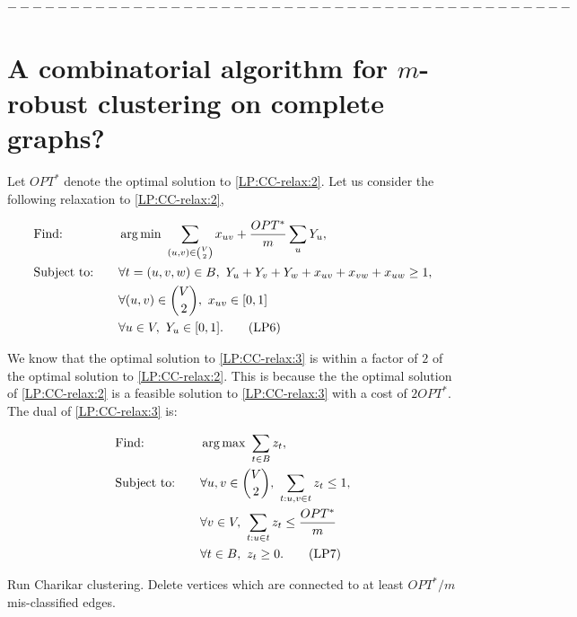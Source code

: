 $---------------------------------------------$

\section{A combinatorial algorithm for $m$-robust clustering on complete graphs?}

Let $OPT^*$ denote the optimal solution to \ref{LP:CC-relax:2}. Let us consider the following relaxation to \ref{LP:CC-relax:2},

\begin{alignat}{3} \label{LP:CC-relax:3}
		&\text{Find: } && \operatorname*{arg\,min}\ \sum_{(u,v) \in \binom{V}{2}} x_{uv} + \frac{OPT^*}{m} \sum_u Y_u, \nonumber\\
		&\text{Subject to:} \quad && \forall t = (u,v,w) \in B ,\ Y_u + Y_v + Y_w + x_{uv} + x_{vw} + x_{uw} \ge 1, \nonumber\\
		& && \forall (u,v) \in \binom{V}{2},\ x_{uv} \in [ 0,1 ] \nonumber\\
		& && \forall u \in V,\ Y_u \in [0,1]. \tag{LP6}
\end{alignat}

\noindent We know that the optimal solution to \ref{LP:CC-relax:3} is within a factor of $2$ of the optimal solution to \ref{LP:CC-relax:2}. This is because the the optimal solution of \ref{LP:CC-relax:2} is a feasible solution to \ref{LP:CC-relax:3} with a cost of $2 OPT^*$. The dual of \ref{LP:CC-relax:3} is:

\begin{alignat}{3} \label{LP:CC-relax-dual:3}
		&\text{Find: } && \operatorname*{arg\,max}\ \sum_{t \in B} z_t, \nonumber\\
		&\text{Subject to:} \quad && \forall u,v \in \binom{V}{2},\ \sum_{t : u,v \in t} z_t \le 1, \nonumber\\
		& && \forall v \in V,\ \sum_{t : u \in t} z_t \le \frac{OPT^*}{m} \nonumber\\
		& && \forall t \in B,\ z_t \ge 0. \tag{LP7}
\end{alignat}

\begin{algorithm} \label{alg:IP:CC7}
Run Charikar clustering. Delete vertices which are connected to at least $OPT^* / m$ mis-classified edges.
\end{algorithm}

